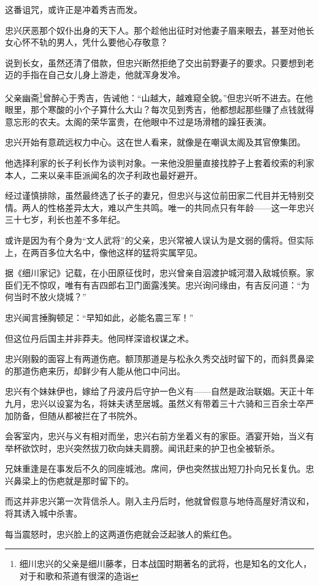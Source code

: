 \documentclass[
]{article}
\begin{document}
这番诅咒，或许正是冲着秀吉而发。

忠兴厌恶那个奴仆出身的天下人。那个趁他出征时对他妻子眉来眼去，甚至对他长女心怀不轨的男人，凭什么要他心存敬意？

说到长女，虽然还清了借款，但忠兴断然拒绝了交出前野妻子的要求。只要想到老迈的手指在自己女儿身上游走，他就浑身发冷。

父亲幽斋\footnote{细川忠兴的父亲是细川藤孝，日本战国时期著名的武将，也是知名的文化人，对于和歌和茶道有很深的造诣}曾醉心于秀吉，告诫他：``山越大，越难窥全貌。''但忠兴听不进去。在他眼里，那个寒酸的小个子算什么大山？每次见到秀吉，他都想起那些赚了点钱就得意忘形的农夫。太阁的荣华富贵，在他眼中不过是场滑稽的躁狂表演。

忠兴开始有意疏远权力中心。这在世人看来，就像是在嘲讽太阁及其官僚集团。

他选择利家的长子利长作为谈判对象。一来他没胆量直接找脖子上套着绞索的利家本人，二来以亲丰臣派闻名的次子利政也最好避开。

经过谨慎排除，虽然最终选了长子的妻兄，但忠兴与这位前田家二代目并无特别交情。两人的性格差异太大，难以产生共鸣。唯一的共同点只有年龄------这一年忠兴三十七岁，利长也差不多年纪。

或许是因为有个身为``文人武将''的父亲，忠兴常被人误认为是文弱的儒将。但实际上，在两百多位大名中，像他这样的猛将实属罕见。

据《细川家记》记载，在小田原征伐时，忠兴曾亲自泅渡护城河潜入敌城侦察。家臣们无不惊叹，唯有有吉四郎右卫门面露浅笑。忠兴询问缘由，有吉反问道：``为何当时不放火烧城？''

忠兴闻言捶胸顿足：``早知如此，必能名震三军！''

但这位丹后国主并非莽夫。他同样深谙权谋之术。

忠兴刚毅的面容上有两道伤疤。额顶那道是与松永久秀交战时留下的，而斜贯鼻梁的那道伤疤来历，却鲜少有人能从他口中问出。

忠兴有个妹妹伊也，嫁给了丹波丹后守护一色义有------自然是政治联姻。天正十年九月，忠兴以设宴为名，将妹夫诱至居城。虽然义有带着三十六骑和三百余士卒严加防备，但随从都被拦在了书院外。

会客室内，忠兴与义有相对而坐，忠兴右前方坐着义有的家臣。酒宴开始，当义有举杯欲饮时，忠兴突然拔刀砍向妹夫肩膀。闻讯赶来的护卫也全被斩杀。

兄妹重逢是在事发后不久的同座城池。席间，伊也突然拔出短刀扑向兄长复仇。忠兴鼻梁上的伤疤就是那时留下的。

而这并非忠兴第一次背信杀人。刚入主丹后时，他就曾假意与地侍高屋好清议和，将其诱入城中杀害。

每当震怒时，忠兴脸上的这两道伤疤就会泛起骇人的紫红色。
\end{document}
